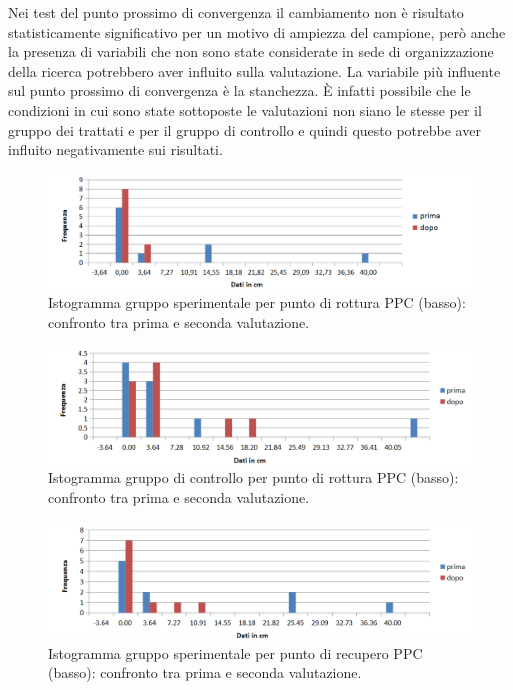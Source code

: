 Nei test del punto prossimo di convergenza il cambiamento non è risultato statisticamente significativo per un motivo di ampiezza del campione, però anche la presenza di variabili che non sono state considerate in sede di organizzazione della ricerca potrebbero aver influito sulla valutazione. La variabile più influente sul punto prossimo di convergenza è la stanchezza. È infatti possibile che le condizioni in cui sono state sottoposte le valutazioni non siano le stesse per il gruppo dei trattati e per il gruppo di controllo e quindi questo potrebbe aver influito negativamente sui risultati.
 \begin{figure}[h!]
	\centering
	\includegraphics[scale=0.38]{source/grafici/PPC_BASSO_DEFINITIVO.png}
	\caption[Istogramma gruppo sperimentale per punto di rottura PPC (basso)]{Istogramma gruppo sperimentale per punto di rottura PPC (basso): confronto tra prima e seconda valutazione.}
	\label{fig:issuexample}
\end{figure}
 \begin{figure}[h!]
	\centering
	\includegraphics[scale=0.38]{source/grafici/PPC_BASSO_CONTROLLO.png}
	\caption[Istogramma gruppo di controllo per punto di rottura PPC (basso)]{Istogramma gruppo di controllo per punto di rottura PPC (basso): confronto tra prima e seconda valutazione.}
	\label{fig:issuexample}
\end{figure}
 \begin{figure}[h!]
	\centering
	\includegraphics[scale=0.38]{source/grafici/Grafico_recupero_PPC_basso_trattati.png}
	\caption[Istogramma gruppo sperimentale per punto di recupero PPC (basso)]{Istogramma gruppo sperimentale per punto di recupero PPC (basso): confronto tra prima e seconda valutazione.}
	\label{fig:issuexample}
\end{figure}
